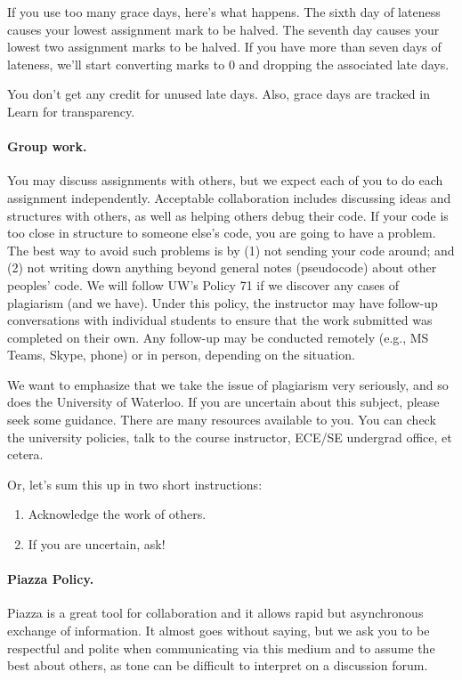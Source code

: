 \documentclass[letterpaper,10pt]{article}
\begin{document}
If you use too many grace days, here's what happens. The sixth day of lateness causes your lowest assignment mark to be halved. The seventh day causes your lowest two assignment marks to be halved. If you have more than seven days of lateness, we'll start converting marks to 0 and dropping the associated late days.

You don't get any credit for unused late days. Also, grace days are tracked in Learn for transparency.

\paragraph{Group work.} 
You may discuss assignments with others, but we expect each of you to
do each assignment independently. Acceptable collaboration includes
discussing ideas and structures with others, as well as helping others
debug their code. If your code is too close in structure to someone
else's code, you are going to have a problem. The best way to avoid
such problems is by (1) not sending your code around; and (2) not
writing down anything beyond general notes (pseudocode) about other
peoples' code. We will follow UW's Policy 71 if we discover any cases of
plagiarism (and we have). Under this policy, the instructor may have follow-up conversations with individual students to ensure that the work submitted was completed on their own. Any follow-up may be conducted remotely (e.g., MS Teams, Skype, phone) or in person, depending on the situation.

We want to emphasize that we take the issue of plagiarism very seriously, and so does the University of Waterloo. If you are uncertain about this subject, please seek some guidance. There are many resources available to you. You can check the university policies, talk to the course instructor, ECE/SE undergrad office, et cetera.

Or, let's sum this up in two short instructions:
\begin{enumerate}
	\item Acknowledge the work of others. 
	\item If you are uncertain, ask!
\end{enumerate}

\paragraph{Piazza Policy.}
Piazza is a great tool for collaboration and it allows rapid but asynchronous exchange of information. It almost goes without saying, but we ask you to be respectful and polite when communicating via this medium and to assume the best about others, as tone can be difficult to interpret on a discussion forum. 
\end{document}
